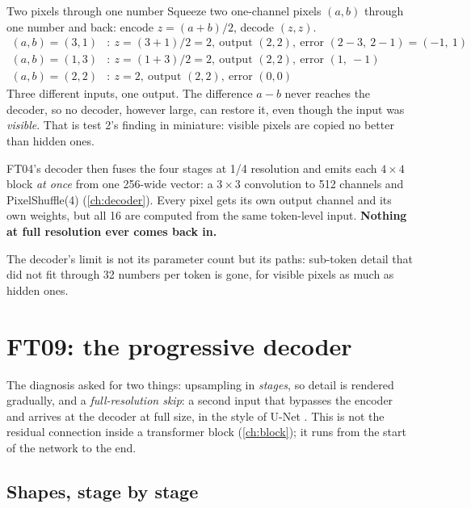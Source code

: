 \begin{worked}[label={we:decoderwork:rank}]{Two pixels through one number}
Squeeze two one-channel pixels $(a,b)$ through one number and back: encode $z=(a+b)/2$, decode $(z,z)$.
\begin{align*}
(a,b)=(3,1)&:\ z=(3+1)/2=2,\ \text{output }(2,2),\ \text{error }(2-3,\ 2-1)=(-1,\ 1)\\
(a,b)=(1,3)&:\ z=(1+3)/2=2,\ \text{output }(2,2),\ \text{error }(1,\ -1)\\
(a,b)=(2,2)&:\ z=2,\ \text{output }(2,2),\ \text{error }(0,0)
\end{align*}
Three different inputs, one output. The difference $a-b$ never reaches the decoder, so no decoder, however large,
can restore it, even though the input was \emph{visible}. That is test 2's finding in miniature: visible
pixels are copied no better than hidden ones.
\end{worked}

FT04's decoder then fuses the four stages at 1/4 resolution and emits each $4\times4$ block \emph{at once} from
one 256-wide vector: a $3\times3$ convolution to 512 channels and PixelShuffle(4) (\cref{ch:decoder}). Every
pixel gets its own output channel and its own weights, but all 16 are computed from the same token-level input.
\textbf{Nothing at full resolution ever comes back in.}

\begin{keypoint}
The decoder's limit is not its parameter count but its paths: sub-token detail that did not fit through 32
numbers per token is gone, for visible pixels as much as hidden ones.
\end{keypoint}

\section{FT09: the progressive decoder}\label{sec:decoderwork:ft09}

The diagnosis asked for two things: upsampling in \emph{stages}, so detail is rendered gradually, and a
\emph{full-resolution skip}: a second input that bypasses the encoder
and arrives at the decoder at full size, in the style of U-Net \citep{ronneberger2015unet}. This is not the
residual connection inside a transformer block (\cref{ch:block}); it runs from the start of the network to the
end.

\subsection{Shapes, stage by stage}

